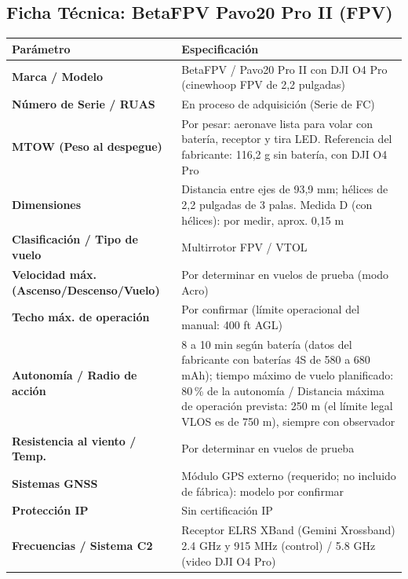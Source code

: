 \subsection{Ficha Técnica: BetaFPV Pavo20 Pro II (FPV)}
\begin{table}[H]
    \centering
    \renewcommand{\arraystretch}{1.2}
    \begin{tabular}{|p{5cm}|p{9cm}|}
        \hline
        \rowcolor[gray]{0.9} \textbf{Parámetro} & \textbf{Especificación} \\ \hline
        \textbf{Marca / Modelo} & BetaFPV / Pavo20 Pro II con DJI O4 Pro (cinewhoop FPV de 2,2 pulgadas) \\ \hline
        \textbf{Número de Serie / RUAS} & En proceso de adquisición (Serie de FC) \\ \hline
        \textbf{MTOW (Peso al despegue)} & Por pesar: aeronave lista para volar con batería, receptor y tira LED. Referencia del fabricante: 116,2 g sin batería, con DJI O4 Pro \\ \hline
        \textbf{Dimensiones} & Distancia entre ejes de 93,9 mm; hélices de 2,2 pulgadas de 3 palas. Medida D (con hélices): por medir, aprox. 0,15 m \\ \hline
        \textbf{Clasificación / Tipo de vuelo} & Multirrotor FPV / VTOL \\ \hline
        \textbf{Velocidad máx. (Ascenso/Descenso/Vuelo)} & Por determinar en vuelos de prueba (modo Acro) \\ \hline
        \textbf{Techo máx. de operación} & Por confirmar (límite operacional del manual: 400 ft AGL) \\ \hline
        \textbf{Autonomía / Radio de acción} & 8 a 10 min según batería (datos del fabricante con baterías 4S de 580 a 680 mAh); tiempo máximo de vuelo planificado: 80\,\% de la autonomía / Distancia máxima de operación prevista: 250 m (el límite legal VLOS es de 750 m), siempre con observador \\ \hline
        \textbf{Resistencia al viento / Temp.} & Por determinar en vuelos de prueba \\ \hline
        \textbf{Sistemas GNSS} & Módulo GPS externo (requerido; no incluido de fábrica): modelo por confirmar \\ \hline
        \textbf{Protección IP} & Sin certificación IP \\ \hline
        \textbf{Frecuencias / Sistema C2} & Receptor ELRS XBand (Gemini Xrossband) 2.4 GHz y 915 MHz (control) / 5.8 GHz (video DJI O4 Pro) \\ \hline

\end{tabular}
\end{table}
